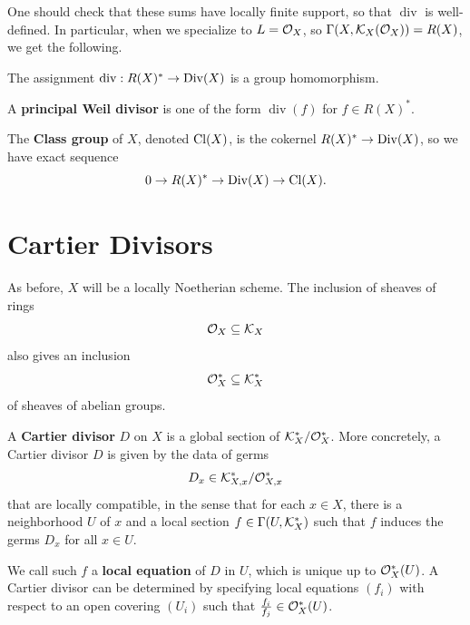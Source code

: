 \documentclass[12pt]{article}
\renewcommand{\div}{\operatorname{div}}
\begin{document}
One should check that these sums have locally finite support, so that $\div$ is well-defined. In particular, when we specialize to $L=\mathcal{O}_X$, so $\Gamma(X,\mathcal{K}_X(\mathcal{O}_X))=R(X)$, we get the following.

\begin{prop}
    The assignment $\div: R(X)^* \to \Div(X)$ is a group homomorphism.
\end{prop}

\begin{defn}
    A \textbf{principal Weil divisor} is one of the form $\div(f)$ for $f\in R(X)^*$.

    The \textbf{Class group} of $X$, denoted $\operatorname{Cl}(X)$, is the cokernel $R(X)^*\to \operatorname{Div}(X)$, so we have exact sequence
    \[0 \to R(X)^* \to \operatorname{Div}(X) \to \operatorname{Cl}(X).\]
\end{defn}


\section{Cartier Divisors}

As before, $X$ will be a locally Noetherian scheme. The inclusion of sheaves of rings
\[\mathcal{O}_X \subseteq \mathcal{K}_X\]
also gives an inclusion
\[\mathcal{O}_X^* \subseteq \mathcal{K}_X^*\]
of sheaves of abelian groups.

\begin{defn}
    A \textbf{Cartier divisor} $D$ on $X$ is a global section of $\mathcal{K}_X^*/\mathcal{O}_X^*$. More concretely, a Cartier divisor $D$ is given by the data of germs
    \[D_x \in \mathcal{K}_{X,x}^*/\mathcal{O}_{X,x}^*\]
    that are locally compatible, in the sense that for each $x\in X$, there is a neighborhood $U$ of $x$ and a local section $f\in \Gamma(U,\mathcal{K}_X^*)$ such that $f$ induces the germs $D_x$ for all $x\in U$.

    We call such $f$ a \textbf{local equation} of $D$ in $U$, which is unique up to $\mathcal{O}_X^*(U)$. A Cartier divisor can be determined by specifying local equations $(f_i)$ with respect to an open covering $(U_i)$ such that $\frac{f_i}{f_j} \in \mathcal{O}_{X}^*(U)$.
\end{defn}
\end{document}
